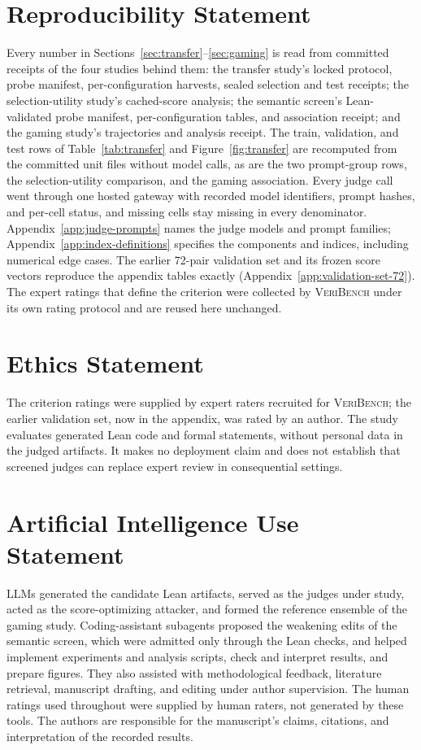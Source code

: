 \clearpage
\section*{Reproducibility Statement}
Every number in Sections~\ref{sec:transfer}--\ref{sec:gaming} is read from committed receipts of the four studies behind them: the transfer study's locked protocol, probe manifest, per-configuration harvests, sealed selection and test receipts; the selection-utility study's cached-score analysis; the semantic screen's Lean-validated probe manifest, per-configuration tables, and association receipt; and the gaming study's trajectories and analysis receipt.
The train, validation, and test rows of Table~\ref{tab:transfer} and Figure~\ref{fig:transfer} are recomputed from the committed unit files without model calls, as are the two prompt-group rows, the selection-utility comparison, and the gaming association.
Every judge call went through one hosted gateway with recorded model identifiers, prompt hashes, and per-cell status, and missing cells stay missing in every denominator.
Appendix~\ref{app:judge-prompts} names the judge models and prompt families; Appendix~\ref{app:index-definitions} specifies the components and indices, including numerical edge cases.
The earlier 72-pair validation set and its frozen score vectors reproduce the appendix tables exactly (Appendix~\ref{app:validation-set-72}).
The expert ratings that define the criterion were collected by \textsc{VeriBench} under its own rating protocol and are reused here unchanged.

\section*{Ethics Statement}
The criterion ratings were supplied by expert raters recruited for \textsc{VeriBench}; the earlier validation set, now in the appendix, was rated by an author.
The study evaluates generated Lean code and formal statements, without personal data in the judged artifacts.
It makes no deployment claim and does not establish that screened judges can replace expert review in consequential settings.

\section*{Artificial Intelligence Use Statement}
LLMs generated the candidate Lean artifacts, served as the judges under study, acted as the score-optimizing attacker, and formed the reference ensemble of the gaming study.
Coding-assistant subagents proposed the weakening edits of the semantic screen, which were admitted only through the Lean checks, and helped implement experiments and analysis scripts, check and interpret results, and prepare figures.
They also assisted with methodological feedback, literature retrieval, manuscript drafting, and editing under author supervision.
The human ratings used throughout were supplied by human raters, not generated by these tools.
The authors are responsible for the manuscript's claims, citations, and interpretation of the recorded results.

